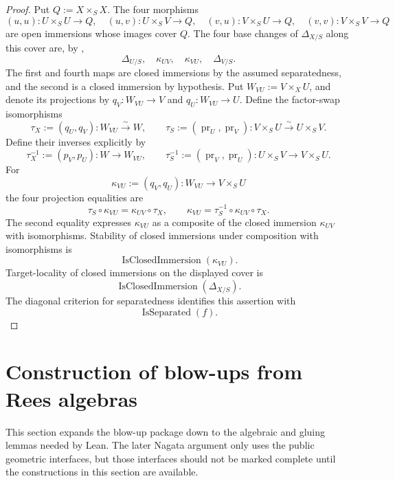 \begin{proof}
  Put $Q:=X\times_SX$.  The four morphisms
  \[
    (u,u)\colon U\times_SU\to Q,\quad
    (u,v)\colon U\times_SV\to Q,\quad
    (v,u)\colon V\times_SU\to Q,\quad
    (v,v)\colon V\times_SV\to Q
  \]
  are open immersions whose images cover $Q$.  The four base changes of
  $\Delta_{X/S}$ along this cover are, by
  ,
  \[
    \Delta_{U/S},\quad \kappa_{UV},\quad
    \kappa_{VU},\quad \Delta_{V/S}.
  \]
  The first and fourth maps are closed immersions by the assumed
  separatedness, and the second is a closed immersion by hypothesis.  Put
  $W_{VU}:=V\times_XU$, and denote its projections by
  $q_V\colon W_{VU}\to V$ and $q_U\colon W_{VU}\to U$.  Define the
  factor-swap isomorphisms
  \[
    \tau_X:=(q_U,q_V)\colon W_{VU}\xrightarrow{\sim}W,
    \qquad
    \tau_S:=(\operatorname{pr}_U,\operatorname{pr}_V)\colon
      V\times_SU\xrightarrow{\sim}U\times_SV.
  \]
  Define their inverses explicitly by
  \[
    \tau_X^{-1}:=(p_V,p_U)\colon W\to W_{VU},
    \qquad
    \tau_S^{-1}:=(\operatorname{pr}_V,\operatorname{pr}_U)\colon
      U\times_SV\to V\times_SU.
  \]
  For
  \[
    \kappa_{VU}:=(q_V,q_U)\colon W_{VU}\longrightarrow V\times_SU
  \]
  the four projection equalities are
  \[
    \tau_S\circ\kappa_{VU}=\kappa_{UV}\circ\tau_X,
    \qquad
    \kappa_{VU}=\tau_S^{-1}\circ\kappa_{UV}\circ\tau_X.
  \]
  The second equality expresses $\kappa_{VU}$ as a composite of the closed
  immersion $\kappa_{UV}$ with isomorphisms.  Stability of closed immersions
  under composition with isomorphisms is
  \[
    \operatorname{IsClosedImmersion}(\kappa_{VU}).
  \]
  Target-locality of closed immersions on the displayed cover is
  \[
    \operatorname{IsClosedImmersion}(\Delta_{X/S}).
  \]
  The diagonal criterion for separatedness identifies this assertion with
  \[
    \operatorname{IsSeparated}(f).
  \]
\end{proof}

\section{Construction of blow-ups from Rees algebras}
\label{sec:nagata-blowup-foundations}

This section expands the blow-up package down to the algebraic and gluing
lemmas needed by Lean.  The later Nagata argument only uses the public
geometric interfaces, but those interfaces should not be marked complete until
the constructions in this section are available.

